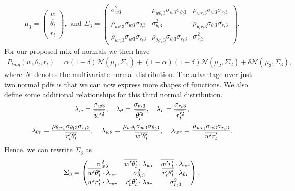 \begin{align*}
    \mu_3 =
    \begin{pmatrix}
        \overline{w}        \\
        \overline{\theta_l} \\
        \overline{r_t}
    \end{pmatrix},
    \text{ and }
    \Sigma_3 =
    \begin{pmatrix}
        \sigma_{w 3}^2 &
        \rho_{w \theta_l 3} \sigma_{w 3} \sigma_{\theta_l 3} &
        \rho_{w r_t 3} \sigma_{w 3} \sigma_{r_t 3} \\
        \rho_{w \theta_l 3} \sigma_{w 3} \sigma_{\theta_l 3} &
        \sigma_{\theta_l 3}^2 &
        \rho_{\theta_l r_t 3} \sigma_{\theta_l 3} \sigma_{r_t 3} \\
        \rho_{w r_t 3} \sigma_{w 3} \sigma_{r_t 3} &
        \rho_{\theta_l r_t 3} \sigma_{\theta_l 3} \sigma_{r_t 3} &
        \sigma_{r_t 3}^2
    \end{pmatrix}.
\end{align*}
For our proposed mix of normals we then have
\begin{align}
    \label{eq:normal_mix_pdf}
    P_{tmg}(w, \theta_l, r_t)
    = \alpha (1-\delta) \mathcal{N}(\mu_1, \Sigma_1)
    + (1-\alpha) (1-\delta) \mathcal{N}(\mu_2, \Sigma_2)
    + \delta \mathcal{N}(\mu_3, \Sigma_3),
\end{align}
where $\mathcal{N}$ denotes the multivariate normal distribution.
The advantage over just two normal \glspl{pdf} is that we can now express more shapes of functions.
We also define some additional relationships for this third normal distribution.
\begin{align}
    \label{eq:lambda}
    \lambda_w = \frac{\sigma_{w 3}}{\overline{w'^2}}, \quad
    \lambda_\theta = \frac{\sigma_{\theta_l 3}}{\overline{\theta_l'^2}}, \quad
    \lambda_r = \frac{\sigma_{r_t 3}}{\overline{r_t'^2}},
\end{align}
\begin{align}
    \label{eq:lambda_two}
    \lambda_{\theta r} = \frac{\rho_{\theta_l r_t} \sigma_{\theta_l 3} \sigma_{r_t 3}}{\overline{r_t' \theta_l'}}, \quad
    \lambda_{w \theta} = \frac{\rho_{w \theta_l} \sigma_{w 3} \sigma_{\theta_l 3}}{\overline{w' \theta_l'}}, \quad
    \lambda_{w r} = \frac{\rho_{w r_t} \sigma_{w 3} \sigma_{r_t 3}}{\overline{w' r_t'}}.
\end{align}
Hence, we can rewrite $\Sigma_3$ as
\begin{align}
    \Sigma_3 =
    \begin{pmatrix}
        \sigma_{w 3}^2 &
        \overline{w' \theta_l'} \cdot \lambda_{w r} &
        \overline{w' r_t'} \cdot \lambda_{w r} \\
        \overline{w' \theta_l'} \cdot \lambda_{w r} &
        \sigma_{\theta_l 3}^2 &
        \overline{r_t' \theta_l'} \cdot \lambda_{\theta r} \\
        \overline{w' r_t'} \cdot \lambda_{w r} &
        \overline{r_t' \theta_l'} \cdot \lambda_{\theta r} &
        \sigma_{r_t 3}^2
    \end{pmatrix}.
\end{align}